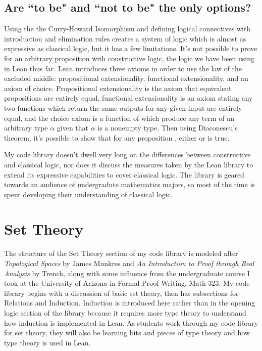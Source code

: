 \subsection{Are ``to be" and ``not to be" the only options?}

Using the the Curry-Howard Isomorphism and defining logical connectives
with introduction and elimination rules creates a system of logic which
is almost as expressive as classical logic, but it has a few limitations.
It's not possible to prove  for an arbitrary proposition 
with constructive logic, the logic we have been using in Lean thus far.
Lean introduces three axioms in order to use the law of the
excluded middle: propositional extensionality, functional
extensionality, and an axiom of choice. Propositional extensionality is the
axiom that equivalent propositions are entirely equal, functional extensionality
is an axiom stating any two functions which return the same outputs for any
given input are entirely equal, and the choice axiom is a function of which produce
any term of an arbitrary type $\alpha$ given that $\alpha$ is a nonempty
type. Then using Diaconescu's theorem, it's possible to show that for any
proposition , either  or  is true. 

My code library doesn't dwell very long on the differences between 
constructive and classical logic, nor does it discuss the measures
taken by the Lean library to extend its expressive capabilities to 
cover classical logic. The library is geared towards an audience of 
undergradute mathematics majors, so most of the time is spent developing
their understanding of classical logic.

\section{Set Theory}

The structure of the Set Theory section of my code library is modeled after 
\textit{Topological Spaces} by James Munkres and 
\textit{An Introduction to Proof through Real Analysis} by Trench, along with
some influence from the undergraduate course I took at the University of Arizona
in Formal Proof-Writing, Math 323. My code library begins with a discussion of basic
set theory, then has subsections for Relations and Induction. 
Induction is introduced here rather than in the opening logic section of the 
library because it requires more type theory to understand how induction is
implemented in Lean. As students work through my code library for set theory,
they will also be learning bits and pieces of type theory and how type theory
is used in Lean. 

